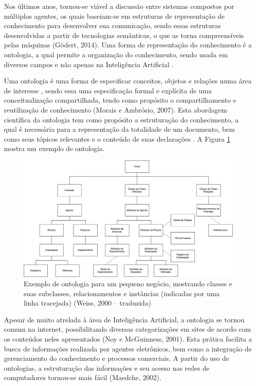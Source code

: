 Nos últimos anos, tornou-se viável a discussão entre sistemas compostos por múltiplos agentes, os quais baseiam-se em estruturas de representação de conhecimento para desenvolver sua comunicação, sendo essas estruturas desenvolvidas a partir de tecnologias semânticas, o que as torna compreensíveis pelas máquinas (Gödert, 2014)\nocite{godert2014}. Uma forma de representação do conhecimento é a ontologia, a qual permite a organização do conhecimento, sendo usada em diversos campos e não apenas na Inteligência Artificial \cite{ONTOLOGIAI}.

Uma  ontologia  é  uma  forma  de  especificar  conceitos,  objetos  e  relações  numa área de interesse \cite{WEISS2000}, sendo essa uma especificação formal e explícita de uma conceitualização compartilhada, tendo como propósito o compartilhamento e reutilização de conhecimento (Morais e Ambrósio, 2007).  Esta abordagem científica da ontologia tem como propósito a estruturação do conhecimento, a qual é necessária para a representação da totalidade de um documento, bem como seus tópicos relevantes e o conteúdo de suas declarações \cite{godert2014}. A Figura \ref{fig:ontologia} mostra um exemplo de ontologia.

\begin{figure}[H]
    \centering
    \caption[Exemplo de Ontologia]{\label{fig:ontologia}Exemplo de ontologia para um pequeno negócio, mostrando classes e suas subclasses, relacionamentos e instâncias (indicadas por uma linha tracejada) (Weiss, 2000 -- traduzida)}
    \includegraphics[width=1\textwidth]{pdf/ontology-weiss.pdf}
\end{figure}

Apesar de muito atrelada à área de Inteligência Artificial, a ontologia se tornou comum na internet, possibilitando diversas categorizações em sites de acordo com os conteúdos neles apresentados (Noy e McGuinness, 2001). Esta prática facilita a busca de informações realizada por agentes eletrônicos, bem como a integração de gerenciamento do conhecimento e processos comerciais. A partir do uso de ontologias, a estruturação das informações e seu acesso nas redes de computadores tornou-se mais fácil (Maedche, 2002)\nocite{MAEDCHE2002}.


